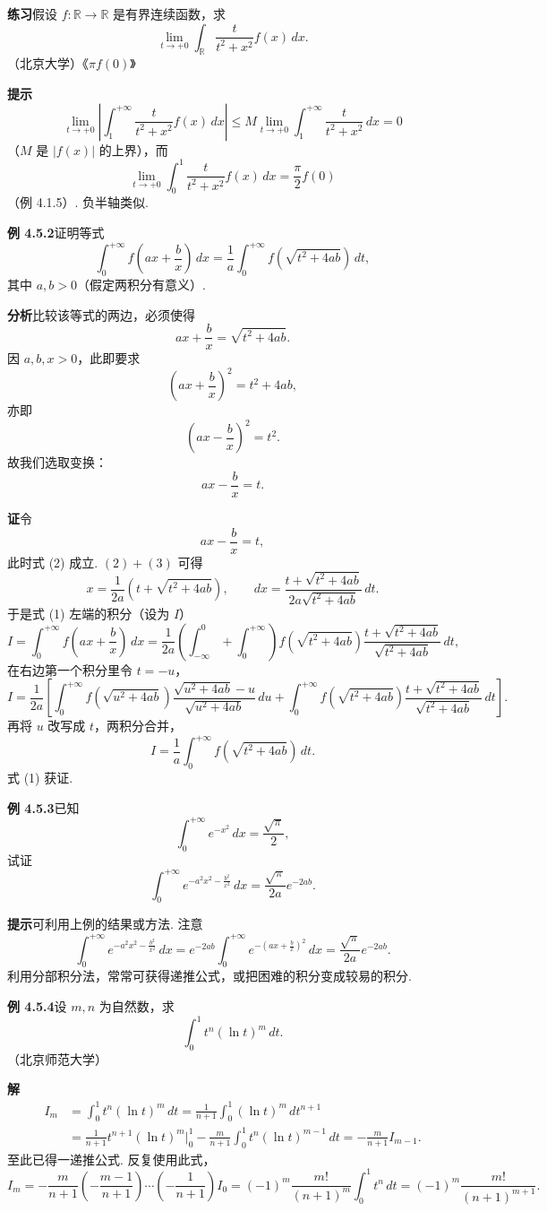 \documentclass[UTF8, 12pt, fontset=fandol, oneside]{ctexart}
\begin{document}
\noindent\textbf{练习}\quad 假设 $f:\mathbb{R}\to\mathbb{R}$ 是有界连续函数，求
\[
\lim_{t\to+0}\int_{\mathbb{R}}\frac{t}{t^2+x^2}f(x)\,dx.
\]
（北京大学）\hfill《$\pi f(0)$》

\noindent\textbf{提示}\quad
\[
\lim_{t\to+0}\left|\int_1^{+\infty}\frac{t}{t^2+x^2}f(x)\,dx\right|
\le M\lim_{t\to+0}\int_1^{+\infty}\frac{t}{t^2+x^2}\,dx=0
\]
（$M$ 是 $|f(x)|$ 的上界），而
\[
\lim_{t\to+0}\int_0^1\frac{t}{t^2+x^2}f(x)\,dx
=\frac\pi2 f(0)
\]
（例 4.1.5）. 负半轴类似.

\noindent\textbf{例 4.5.2}\quad 证明等式
\[
\int_0^{+\infty}f\left(ax+\frac bx\right)\,dx
=\frac1a\int_0^{+\infty}f\left(\sqrt{t^2+4ab}\right)\,dt, \tag{1}
\]
其中 $a,b>0$（假定两积分有意义）.

\noindent\textbf{分析}\quad 比较该等式的两边，必须使得
\[
ax+\frac bx=\sqrt{t^2+4ab}. \tag{2}
\]
因 $a,b,x>0$，此即要求
\[
\left(ax+\frac bx\right)^2=t^2+4ab,
\]
亦即
\[
\left(ax-\frac bx\right)^2=t^2.
\]
故我们选取变换：
\[
ax-\frac bx=t.
\]

\noindent\textbf{证}\quad 令
\[
ax-\frac bx=t, \tag{3}
\]
此时式 (2) 成立. $(2)+(3)$ 可得
\[
x=\frac1{2a}\left(t+\sqrt{t^2+4ab}\right),\qquad
dx=\frac{t+\sqrt{t^2+4ab}}{2a\sqrt{t^2+4ab}}\,dt.
\]
于是式 (1) 左端的积分（设为 $I$）
\[
I=\int_0^{+\infty}f\left(ax+\frac bx\right)\,dx
=\frac1{2a}\left(\int_{-\infty}^0+\int_0^{+\infty}\right)
f\left(\sqrt{t^2+4ab}\right)
\frac{t+\sqrt{t^2+4ab}}{\sqrt{t^2+4ab}}\,dt,
\]
在右边第一个积分里令 $t=-u$，
\[
I=\frac1{2a}\left[
\int_0^{+\infty}f\left(\sqrt{u^2+4ab}\right)
\frac{\sqrt{u^2+4ab}-u}{\sqrt{u^2+4ab}}\,du
+\int_0^{+\infty}f\left(\sqrt{t^2+4ab}\right)
\frac{t+\sqrt{t^2+4ab}}{\sqrt{t^2+4ab}}\,dt
\right].
\]
再将 $u$ 改写成 $t$，两积分合并，
\[
I=\frac1a\int_0^{+\infty}f\left(\sqrt{t^2+4ab}\right)\,dt.
\]
式 (1) 获证.

\noindent\textbf{例 4.5.3}\quad 已知
\[
\int_0^{+\infty}e^{-x^2}\,dx=\frac{\sqrt\pi}{2},
\]
试证
\[
\int_0^{+\infty}e^{-a^2x^2-\frac{b^2}{x^2}}\,dx
=\frac{\sqrt\pi}{2a}e^{-2ab}.
\]

\noindent\textbf{提示}\quad 可利用上例的结果或方法. 注意
\[
\int_0^{+\infty}e^{-a^2x^2-\frac{b^2}{x^2}}\,dx
=e^{-2ab}\int_0^{+\infty}e^{-\left(ax+\frac bx\right)^2}\,dx
=\frac{\sqrt\pi}{2a}e^{-2ab}.
\]
利用分部积分法，常常可获得递推公式，或把困难的积分变成较易的积分.

\noindent\textbf{例 4.5.4}\quad 设 $m,n$ 为自然数，求
\[
\int_0^1 t^n(\ln t)^m\,dt.
\]
（北京师范大学）

\noindent\textbf{解}\quad
\[
\begin{aligned}
I_m&=\int_0^1 t^n(\ln t)^m\,dt
=\frac1{n+1}\int_0^1(\ln t)^m\,dt^{n+1}\\
&=\frac1{n+1}t^{n+1}(\ln t)^m\Big|_0^1
-\frac{m}{n+1}\int_0^1 t^n(\ln t)^{m-1}\,dt
=-\frac{m}{n+1}I_{m-1}.
\end{aligned}
\]
至此已得一递推公式. 反复使用此式，
\[
I_m=-\frac{m}{n+1}\left(-\frac{m-1}{n+1}\right)\cdots
\left(-\frac1{n+1}\right)I_0
=(-1)^m\frac{m!}{(n+1)^m}\int_0^1t^n\,dt
=(-1)^m\frac{m!}{(n+1)^{m+1}}.
\]
\end{document}
